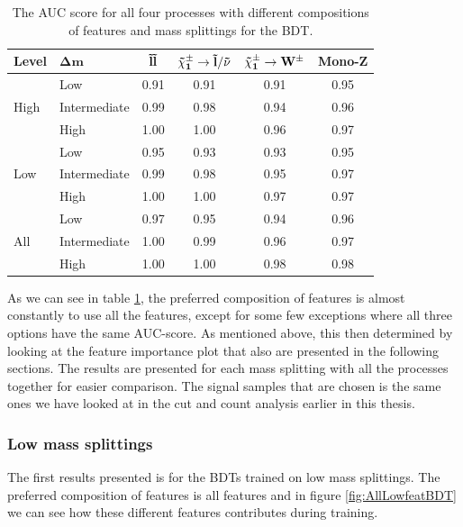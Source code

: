 \begin{table}[H]
    \centering
    \renewcommand{\arraystretch}{1.}
    \begin{tabular}{l l c c c c }
    \toprule
    \textbf{Level} & $\mathbf{\Delta m}$ & $\mathbf{\Tilde{l} \Tilde{l}}$ & $\mathbf{\Tilde{\chi}_1^\pm \rightarrow \Tilde{l}/\Tilde{\nu}}$ & $\mathbf{\Tilde{\chi}_1^\pm \rightarrow W^\pm}$ & \textbf{Mono-Z}  \\
    \midrule
    \midrule
    \multirow{3}{*}{High} &  Low   & 0.91 & 0.91 & 0.91 & 0.95 \\
     & Intermediate & 0.99 & 0.98 & 0.94 & 0.96 \\
     & High & 1.00 & 1.00 & 0.96 & 0.97 \\
     \midrule
    \multirow{3}{*}{Low} & Low & 0.95 & 0.93 & 0.93 & 0.95 \\
     & Intermediate & 0.99 & 0.98 & 0.95 & 0.97 \\
     & High & 1.00 & 1.00 & 0.97 & 0.97 \\
     \midrule
    \multirow{3}{*}{All} & Low & 0.97 & 0.95 & 0.94 & 0.96 \\
     & Intermediate & 1.00 & 0.99 & 0.96 & 0.97 \\
     & High & 1.00 & 1.00 & 0.98 & 0.98 \\
     \bottomrule
    \end{tabular}
    \caption{The AUC score for all four processes with different compositions of features and mass splittings for the BDT.}
    \label{tab:AUCBDT}
\end{table}


As we can see in table \ref{tab:AUCBDT}, the preferred composition of features is almost constantly to use all the features, except for some few exceptions where all three options have the same AUC-score. As mentioned above, this then determined by looking at the feature importance plot that also are presented in the following sections. The results are presented for each mass splitting with all the processes together for easier comparison. The signal samples that are chosen is the same ones we have looked at in the cut and count analysis earlier in this thesis.
















\subsubsection{Low mass splittings}
The first results presented is for the BDTs trained on low mass splittings. The preferred composition of features is all features and in figure \ref{fig:AllLowfeatBDT} we can see how these different features contributes during training. 


